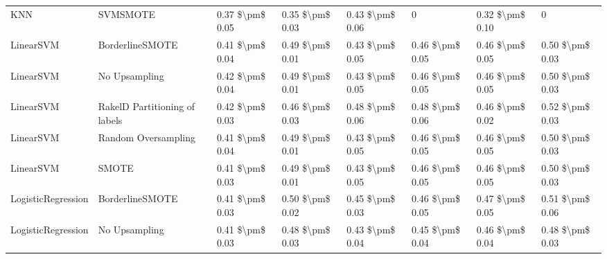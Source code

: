 \begin{tabular}{llllllll}
                            KNN &                      SVMSMOTE & 0.37 \$\textbackslash pm\$ 0.05 &           0.35 \$\textbackslash pm\$ 0.03 &       0.43 \$\textbackslash pm\$ 0.06 &                      0 &                         0.32 \$\textbackslash pm\$ 0.10 &                   0 \\
                      LinearSVM &               BorderlineSMOTE & 0.41 \$\textbackslash pm\$ 0.04 &           0.49 \$\textbackslash pm\$ 0.01 &       0.43 \$\textbackslash pm\$ 0.05 &        0.46 \$\textbackslash pm\$ 0.05 &                         0.46 \$\textbackslash pm\$ 0.05 &     0.50 \$\textbackslash pm\$ 0.03 \\
                      LinearSVM &                 No Upsampling & 0.42 \$\textbackslash pm\$ 0.04 &           0.49 \$\textbackslash pm\$ 0.01 &       0.43 \$\textbackslash pm\$ 0.05 &        0.46 \$\textbackslash pm\$ 0.05 &                         0.46 \$\textbackslash pm\$ 0.05 &     0.50 \$\textbackslash pm\$ 0.03 \\
                      LinearSVM & RakelD Partitioning of labels & 0.42 \$\textbackslash pm\$ 0.03 &           0.46 \$\textbackslash pm\$ 0.03 &       0.48 \$\textbackslash pm\$ 0.06 &        0.48 \$\textbackslash pm\$ 0.06 &                         0.46 \$\textbackslash pm\$ 0.02 &     0.52 \$\textbackslash pm\$ 0.03 \\
                      LinearSVM &           Random Oversampling & 0.41 \$\textbackslash pm\$ 0.04 &           0.49 \$\textbackslash pm\$ 0.01 &       0.43 \$\textbackslash pm\$ 0.05 &        0.46 \$\textbackslash pm\$ 0.05 &                         0.46 \$\textbackslash pm\$ 0.05 &     0.50 \$\textbackslash pm\$ 0.03 \\
                      LinearSVM &                         SMOTE & 0.41 \$\textbackslash pm\$ 0.03 &           0.49 \$\textbackslash pm\$ 0.01 &       0.43 \$\textbackslash pm\$ 0.05 &        0.46 \$\textbackslash pm\$ 0.05 &                         0.46 \$\textbackslash pm\$ 0.05 &     0.50 \$\textbackslash pm\$ 0.03 \\
             LogisticRegression &               BorderlineSMOTE & 0.41 \$\textbackslash pm\$ 0.03 &           0.50 \$\textbackslash pm\$ 0.02 &       0.45 \$\textbackslash pm\$ 0.03 &        0.46 \$\textbackslash pm\$ 0.05 &                         0.47 \$\textbackslash pm\$ 0.05 &     0.51 \$\textbackslash pm\$ 0.06 \\
             LogisticRegression &                 No Upsampling & 0.41 \$\textbackslash pm\$ 0.03 &           0.48 \$\textbackslash pm\$ 0.03 &       0.43 \$\textbackslash pm\$ 0.04 &        0.45 \$\textbackslash pm\$ 0.04 &                         0.46 \$\textbackslash pm\$ 0.04 &     0.48 \$\textbackslash pm\$ 0.03 \\

\end{tabular}
